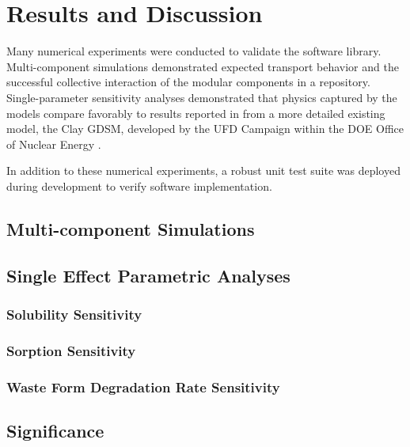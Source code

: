 \section{Results and Discussion}
\label{sec:results}

Many numerical experiments were conducted to validate the \Cyder software library.
Multi-component simulations demonstrated expected transport behavior and
the successful collective interaction of the modular
components in a \Cyder repository. Single-parameter sensitivity analyses
demonstrated that physics captured by the \Cyder models compare favorably to
results reported in \cite{huff_key_2012} from a more detailed existing model,
the Clay \gls{GDSM}, developed by the \gls{UFD} Campaign within the
\gls{DOE} Office of Nuclear Energy \cite{clayton_generic_2011}.

In addition to these numerical experiments, a robust unit test suite was
deployed during development to verify \Cyder software implementation.

\subsection{Multi-component Simulations}




\subsection{Single Effect Parametric Analyses}
\subsubsection{Solubility Sensitivity}

\FloatBarrier
\subsubsection{Sorption Sensitivity}

\FloatBarrier
\subsubsection{Waste Form Degradation Rate Sensitivity}

\FloatBarrier
\subsection{Significance}

